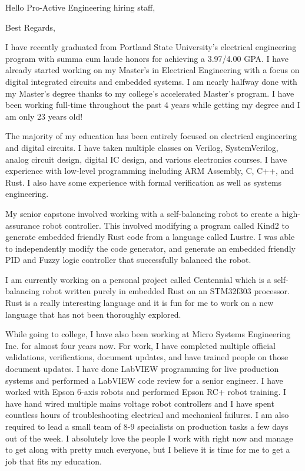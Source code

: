 \documentclass[letterpaper]{moderncv}        %
\begin{document}
    
\recipient{ }{ }
\date{\today}
\opening{Hello Pro-Active Engineering hiring staff,}
\closing{Best Regards,}
\makelettertitle

I have recently graduated from Portland State University's electrical engineering program with summa cum laude honors for achieving a 3.97/4.00 GPA.  I have already started working on my Master's in Electrical Engineering with a focus on digital integrated circuits and embedded systems.  I am nearly halfway done with my Master's degree thanks to my college's accelerated Master’s program.  I have been working full-time throughout the past 4 years while getting my degree and I am only 23 years old!

The majority of my education has been entirely focused on electrical engineering and digital circuits.  I have taken multiple classes on Verilog, SystemVerilog, analog circuit design, digital IC design, and various electronics courses.  I have experience with low-level programming including ARM Assembly, C, C++, and Rust.  I also have some experience with formal verification as well as systems engineering.

My senior capstone involved working with a self-balancing robot to create a high-assurance robot controller.  This involved modifying a program called Kind2 to generate embedded friendly Rust code from a language called Lustre.  I was able to independently modify the code generator, and generate an embedded friendly PID and Fuzzy logic controller that successfully balanced the robot.

I am currently working on a personal project called Centennial which is a self-balancing robot written purely in embedded Rust on an STM32f303 processor.  Rust is a really interesting language and it is fun for me to work on a new language that has not been thoroughly explored.

While going to college, I have also been working at Micro Systems Engineering Inc. for almost four years now.   For work, I have completed multiple official validations, verifications, document updates, and have trained people on those document updates.  I have done LabVIEW programming for live production systems and performed a LabVIEW code review for a senior engineer.  I have worked with Epson 6-axis robots and performed Epson RC+ robot training.  I have hand wired multiple mains voltage robot controllers and I have spent countless hours of troubleshooting electrical and mechanical failures.  I am also required to lead a small team of 8-9 specialists on production tasks a few days out of the week.  I absolutely love the people I work with right now and manage to get along with pretty much everyone, but I believe it is time for me to get a job that fits my education.

\makeletterclosing
\end{document}
